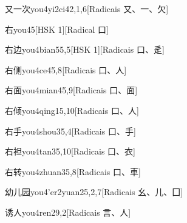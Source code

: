 \begin{entry}{又一次}{you4yi2ci4}{2,1,6}[Radicais ⼜、⼀、⽋]
\end{entry}

\begin{entry}{右}{you4}{5}[HSK 1][Radical ⼝]
\end{entry}

\begin{entry}{右边}{you4bian5}{5,5}[HSK 1][Radicais ⼝、⾡]
\end{entry}

\begin{entry}{右侧}{you4ce4}{5,8}[Radicais ⼝、⼈]
\end{entry}

\begin{entry}{右面}{you4mian4}{5,9}[Radicais ⼝、⾯]
\end{entry}

\begin{entry}{右倾}{you4qing1}{5,10}[Radicais ⼝、⼈]
\end{entry}

\begin{entry}{右手}{you4shou3}{5,4}[Radicais ⼝、⼿]
\end{entry}

\begin{entry}{右袒}{you4tan3}{5,10}[Radicais ⼝、⾐]
\end{entry}

\begin{entry}{右转}{you4zhuan3}{5,8}[Radicais ⼝、⾞]
\end{entry}

\begin{entry}{幼儿园}{you4'er2yuan2}{5,2,7}[Radicais ⼳、⼉、⼞]
\end{entry}

\begin{entry}{诱人}{you4ren2}{9,2}[Radicais ⾔、⼈]
\end{entry}

